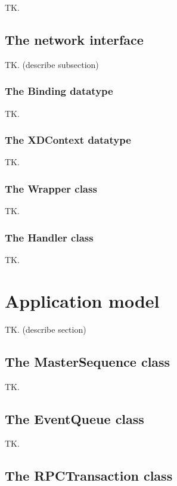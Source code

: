 \documentclass[11pt, oneside]{article}
\begin{document}
                TK.

        \subsection{The network interface}

            TK. (describe subsection)

            \subsubsection{The Binding datatype}

                TK.

            \subsubsection{The XDContext datatype}

                TK.

            \subsubsection{The Wrapper class}

                TK.

            \subsubsection{The Handler class}

                TK.

    \section{Application model}

        TK. (describe section)

        \subsection{The MasterSequence class}

            TK.

        \subsection{The EventQueue class}

            TK.

        \subsection{The RPCTransaction class}
\end{document}
